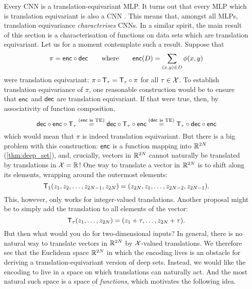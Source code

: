 \documentclass[12pt, twoside]{report}
\begin{document}
Every CNN is a translation-equivariant MLP.
It turns out that every MLP which is translation equivariant is also a CNN \parencite{Kondor:2018:On_the_Generalization_of_Equivariance}.
This means that, amongst all MLPs, translation equivariance \emph{characterises} CNNs.
In a similar spirit, the main result of this section is a characterisation of functions on data sets which are translation equivariant.
Let us for a moment contemplate such a result.
Suppose that 
\begin{equation}
    \pi = \mathsf{enc} \circ \mathsf{dec} \qquad \text{where} \qquad \mathsf{enc}(D) = \sum_{(x, y) \in D} \phi(x, y)
\end{equation}
were translation equivariant: $\pi \comp \T_\tau = \T_\tau \comp \pi$ for all $\tau \in \mathcal{X}$.
To establish translation equivariance of $\pi$, one reasonable construction would be to ensure that $\mathsf{enc}$ and $\mathsf{dec}$ are translation equivariant.
If that were true, then, by associativity of function composition,%
\begin{equation}
    \dec \comp \enc \comp \T_\tau
    \overset{\text{($\enc$ is TE)}}{=} \dec \comp \T_\tau \comp \enc
    \overset{\text{($\dec$ is TE)}}{=} \T_\tau \comp \dec \comp \enc
\end{equation}
which would mean that $\pi$ is indeed translation equivariant.
But there is a big problem with this construction:
$\mathsf{enc}$ is a function mapping into $\mathbb{R}^{2N}$ (\cref{thm:deep_set}),
and, crucially, vectors in $\mathbb{R}^{2N}$ cannot naturally be translated by translations in $\mathcal{X} = \mathbb{R}$!
One way to translate a vector in $\mathbb{R}^{2N}$ is to shift along its elements, wrapping around the outermost elements:%
\begin{equation}
    \T_1 (z_1, z_2, \ldots, z_{2N-1}, z_{2N})
    = (z_{2N}, z_1, \ldots, z_{2N-2}, z_{2N - 1}).
\end{equation}
This, however, only works for integer-valued translations.
Another proposal might be to simply add the translation to all elements of the vector:
\begin{equation}
    \T_{\tau} (z_1, \ldots, z_{2N})
    = (z_1 + \tau, \ldots, z_{2N} + \tau).
\end{equation}
But then what would you do for two-dimensional inputs?
In general, there is no natural way to translate vectors in $\mathbb{R}^{2N}$ by $\mathcal{X}$-valued translations.
We therefore see that the Euclidean space $\mathbb{R}^{2N}$ in which the encoding lives is an obstacle for deriving a translation-equivariant version of deep sets.
Instead, we would like the encoding to live in a space on which translations can naturally act.
And the most natural such space is a space of \emph{functions}, which motivates the following idea.
\end{document}
